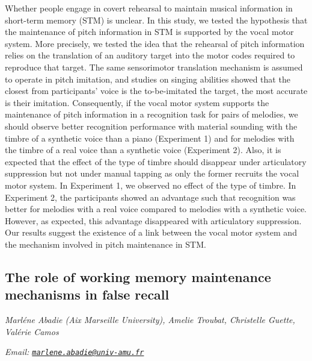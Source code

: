 \documentclass[
  12pt,
]{book}
\begin{document}
Whether people engage in covert rehearsal to maintain musical information in short-term memory (STM) is unclear. In this study, we tested the hypothesis that the maintenance of pitch information in STM is supported by the vocal motor system. More precisely, we tested the idea that the rehearsal of pitch information relies on the translation of an auditory target into the motor codes required to reproduce that target. The same sensorimotor translation mechanism is assumed to operate in pitch imitation, and studies on singing abilities showed that the closest from participants' voice is the to-be-imitated the target, the most accurate is their imitation. Consequently, if the vocal motor system supports the maintenance of pitch information in a recognition task for pairs of melodies, we should observe better recognition performance with material sounding with the timbre of a synthetic voice than a piano (Experiment 1) and for melodies with the timbre of a real voice than a synthetic voice (Experiment 2). Also, it is expected that the effect of the type of timbre should disappear under articulatory suppression but not under manual tapping as only the former recruits the vocal motor system. In Experiment 1, we observed no effect of the type of timbre. In Experiment 2, the participants showed an advantage such that recognition was better for melodies with a real voice compared to melodies with a synthetic voice. However, as expected, this advantage disappeared with articulatory suppression. Our results suggest the existence of a link between the vocal motor system and the mechanism involved in pitch maintenance in STM.

\hypertarget{the-role-of-working-memory-maintenance-mechanisms-in-false-recall}{%
\subsection{The role of working memory maintenance mechanisms in false recall}\label{the-role-of-working-memory-maintenance-mechanisms-in-false-recall}}

\emph{Marléne Abadie (Aix Marseille University), Amelie Troubat, Christelle Guette, Valérie Camos}

\emph{Email: \href{mailto:marlene.abadie@univ-amu.fr}{\nolinkurl{marlene.abadie@univ-amu.fr}}}
\end{document}
